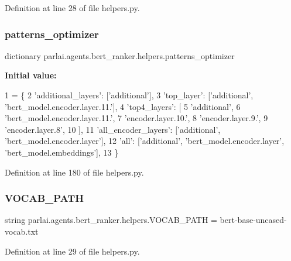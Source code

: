 Definition at line 28 of file helpers.\+py.

\mbox{\label{namespaceparlai_1_1agents_1_1bert__ranker_1_1helpers_aebda7127ff111489042a68edcd62830f}} 
\subsubsection{\texorpdfstring{patterns\+\_\+optimizer}{patterns\_optimizer}}
{\footnotesize\ttfamily dictionary parlai.\+agents.\+bert\+\_\+ranker.\+helpers.\+patterns\+\_\+optimizer}

{\bfseries Initial value\+:}
\begin{DoxyCode}
1 =  \{
2     \textcolor{stringliteral}{'additional\_layers'}: [\textcolor{stringliteral}{'additional'}],
3     \textcolor{stringliteral}{'top\_layer'}: [\textcolor{stringliteral}{'additional'}, \textcolor{stringliteral}{'bert\_model.encoder.layer.11.'}],
4     \textcolor{stringliteral}{'top4\_layers'}: [
5         \textcolor{stringliteral}{'additional'},
6         \textcolor{stringliteral}{'bert\_model.encoder.layer.11.'},
7         \textcolor{stringliteral}{'encoder.layer.10.'},
8         \textcolor{stringliteral}{'encoder.layer.9.'},
9         \textcolor{stringliteral}{'encoder.layer.8'},
10     ],
11     \textcolor{stringliteral}{'all\_encoder\_layers'}: [\textcolor{stringliteral}{'additional'}, \textcolor{stringliteral}{'bert\_model.encoder.layer'}],
12     \textcolor{stringliteral}{'all'}: [\textcolor{stringliteral}{'additional'}, \textcolor{stringliteral}{'bert\_model.encoder.layer'}, \textcolor{stringliteral}{'bert\_model.embeddings'}],
13 \}
\end{DoxyCode}


Definition at line 180 of file helpers.\+py.

\mbox{\label{namespaceparlai_1_1agents_1_1bert__ranker_1_1helpers_a88c47b25646aed4d2d140a159443bb7c}} 
\subsubsection{\texorpdfstring{V\+O\+C\+A\+B\+\_\+\+P\+A\+TH}{VOCAB\_PATH}}
{\footnotesize\ttfamily string parlai.\+agents.\+bert\+\_\+ranker.\+helpers.\+V\+O\+C\+A\+B\+\_\+\+P\+A\+TH = \textquotesingle{}bert-\/base-\/uncased-\/vocab.\+txt\textquotesingle{}}



Definition at line 29 of file helpers.\+py.

